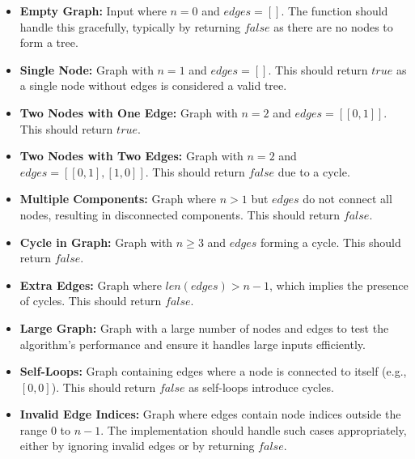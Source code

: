 \begin{itemize}
    \item \textbf{Empty Graph:} Input where \( n = 0 \) and \( edges = [] \). The function should handle this gracefully, typically by returning \( false \) as there are no nodes to form a tree.
    
    \item \textbf{Single Node:} Graph with \( n = 1 \) and \( edges = [] \). This should return \( true \) as a single node without edges is considered a valid tree.
    
    \item \textbf{Two Nodes with One Edge:} Graph with \( n = 2 \) and \( edges = [[0,1]] \). This should return \( true \).
    
    \item \textbf{Two Nodes with Two Edges:} Graph with \( n = 2 \) and \( edges = [[0,1], [1,0]] \). This should return \( false \) due to a cycle.
    
    \item \textbf{Multiple Components:} Graph where \( n > 1 \) but \( edges \) do not connect all nodes, resulting in disconnected components. This should return \( false \).
    
    \item \textbf{Cycle in Graph:} Graph with \( n \geq 3 \) and \( edges \) forming a cycle. This should return \( false \).
    
    \item \textbf{Extra Edges:} Graph where \( len(edges) > n - 1 \), which implies the presence of cycles. This should return \( false \).
    
    \item \textbf{Large Graph:} Graph with a large number of nodes and edges to test the algorithm's performance and ensure it handles large inputs efficiently.
    
    \item \textbf{Self-Loops:} Graph containing edges where a node is connected to itself (e.g., \([0,0]\)). This should return \( false \) as self-loops introduce cycles.
    
    \item \textbf{Invalid Edge Indices:} Graph where edges contain node indices outside the range \( 0 \) to \( n-1 \). The implementation should handle such cases appropriately, either by ignoring invalid edges or by returning \( false \).
\end{itemize}

\printindex